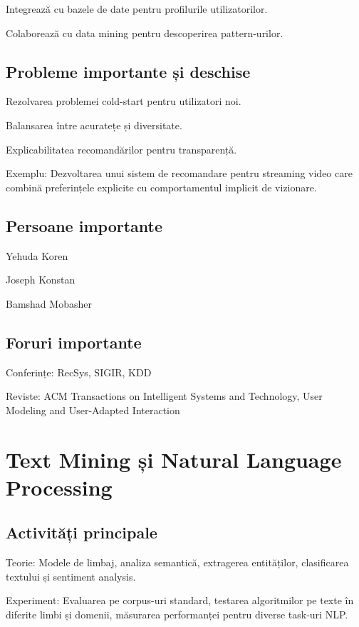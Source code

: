 \documentclass[12pt]{article}
\begin{document}
Integrează cu bazele de date pentru profilurile utilizatorilor.

Colaborează cu data mining pentru descoperirea pattern-urilor.

\subsection*{Probleme importante și deschise}

Rezolvarea problemei cold-start pentru utilizatori noi.

Balansarea între acuratețe și diversitate.

Explicabilitatea recomandărilor pentru transparență.

Exemplu: Dezvoltarea unui sistem de recomandare pentru streaming video care combină preferințele explicite cu comportamentul implicit de vizionare.

\subsection*{Persoane importante}

Yehuda Koren

Joseph Konstan

Bamshad Mobasher

\subsection*{Foruri importante}

Conferințe: RecSys, SIGIR, KDD

Reviste: ACM Transactions on Intelligent Systems and Technology, User Modeling and User-Adapted Interaction

\section{Text Mining și Natural Language Processing}

\subsection*{Activități principale}

Teorie: Modele de limbaj, analiza semantică, extragerea entităților, clasificarea textului și sentiment analysis.

Experiment: Evaluarea pe corpus-uri standard, testarea algoritmilor pe texte în diferite limbi și domenii, măsurarea performanței pentru diverse task-uri NLP.
\end{document}
